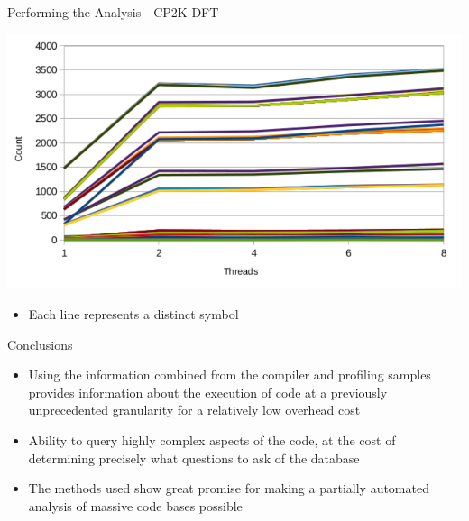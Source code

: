 \documentclass[final]{beamer}
\let\olditem\item
\renewcommand{\item}{\vspace{\fill}\olditem}
\begin{document}
\begin{frame}{\hspace{0.02\paperwidth}Performing the Analysis - CP2K DFT}
\begin{center}
\includegraphics{images/cp2k-omp-inc-full.pdf}
\end{center}
\begin{itemize}
\item Each line represents a distinct symbol
\end{itemize}
\end{frame}


\begin{frame}{\hspace{0.02\paperwidth}Conclusions}
\begin{itemize}
\item Using the information combined from the compiler and profiling samples provides information about the execution of code at a previously unprecedented granularity for a relatively low overhead cost
\item Ability to query highly complex aspects of the code, at the cost of determining precisely what questions to ask of the database
\item The methods used show great promise for making a partially automated analysis of massive code bases possible
\end{itemize}
\end{frame}
\end{document}
